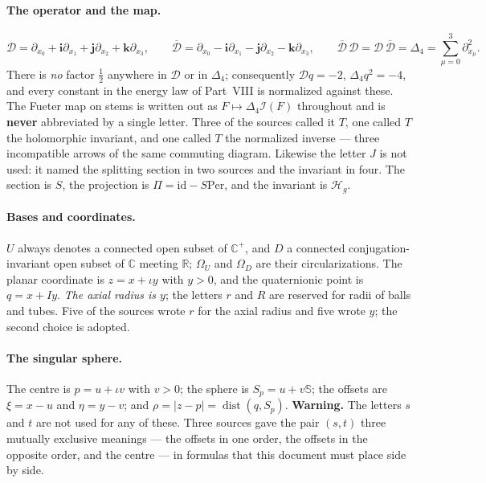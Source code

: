 \documentclass[11pt,a4paper]{article}
\numberwithin{equation}{section}
\theoremstyle{definition}
\theoremstyle{remark}
\theoremstyle{plain}
\newcommand{\RR}{\mathbb R}
\newcommand{\CC}{\mathbb C}
\newcommand{\SSS}{\mathbb S}
\newcommand{\Cplus}{\CC^{+}}
\newcommand{\Dop}{\mathcal D}
\newcommand{\lap}{\Delta_4}
\newcommand{\I}{\mathcal I}
\newcommand{\Om}{\Omega}
\newcommand{\Per}{\mathrm{Per}}
\newcommand{\Sp}{S_{p}}
\newcommand{\Hg}{\mathcal H_{g}}      %
\newcommand{\abs}[1]{\lvert #1\rvert}
\begin{document}
\paragraph{The operator and the map.}
\[
 \Dop=\partial_{x_0}+\mathbf i\partial_{x_1}+\mathbf j\partial_{x_2}
       +\mathbf k\partial_{x_3},
 \qquad
 \overline{\Dop}=\partial_{x_0}-\mathbf i\partial_{x_1}
       -\mathbf j\partial_{x_2}-\mathbf k\partial_{x_3},
 \qquad
 \overline{\Dop}\,\Dop=\Dop\,\overline{\Dop}=\lap=\sum_{\mu=0}^{3}
       \partial_{x_\mu}^2 .
\]
There is \emph{no} factor $\tfrac12$ anywhere in $\Dop$ or in $\lap$;
consequently $\Dop q=-2$, $\lap q^2=-4$, and every constant in the energy law
of Part~VIII is normalized against these. The Fueter map on stems is written
out as $F\mapsto\lap\I(F)$ throughout and is \textbf{never} abbreviated by a
single letter. Three of the sources called it $T$, one called $T$ the
holomorphic invariant, and one called $T$ the normalized inverse --- three
incompatible arrows of the same commuting diagram. Likewise the letter $J$ is
not used: it named the splitting section in two sources and the invariant in
four. The section is $S$, the projection is $\Pi=\mathrm{id}-S\Per$, and the
invariant is $\Hg$.

\paragraph{Bases and coordinates.}
$U$ always denotes a connected open subset of $\Cplus$, and $D$ a connected
conjugation-invariant open subset of $\CC$ meeting $\RR$; $\Om_U$ and $\Om_D$
are their circularizations. The planar coordinate is $z=x+\iota y$ with
$y>0$, and the quaternionic point is $q=x+Iy$. \emph{The axial radius is $y$};
the letters $r$ and $R$ are reserved for radii of balls and tubes. Five of the
sources wrote $r$ for the axial radius and five wrote $y$; the second choice
is adopted.

\paragraph{The singular sphere.}
The centre is $p=u+\iota v$ with $v>0$; the sphere is $\Sp=u+v\SSS$; the
offsets are $\xi=x-u$ and $\eta=y-v$; and
$\rho=\abs{z-p}=\operatorname{dist}(q,\Sp)$.
\textbf{Warning.} The letters $s$ and $t$ are not used for any of these.
Three sources gave the pair $(s,t)$ three mutually exclusive meanings --- the
offsets in one order, the offsets in the opposite order, and the centre --- in
formulas that this document must place side by side.
\end{document}
